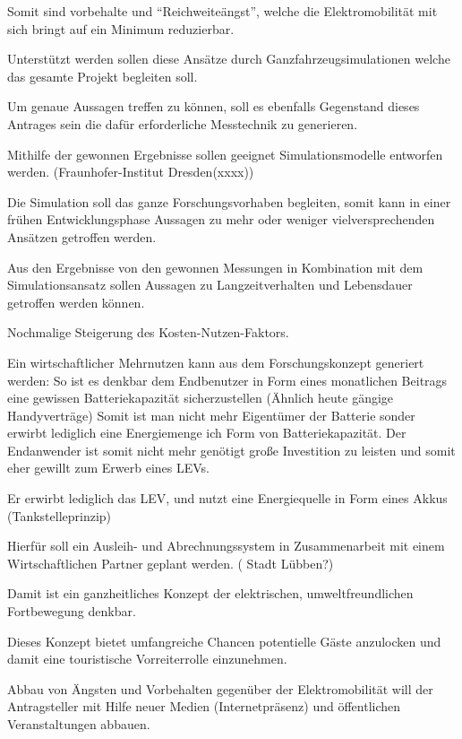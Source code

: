 Somit sind vorbehalte und "`Reichweiteängst"', welche die Elektromobilität mit sich bringt auf ein Minimum reduzierbar.

Unterstützt werden sollen diese Ansätze durch Ganzfahrzeugsimulationen welche das gesamte Projekt begleiten soll.
 
Um genaue Aussagen treffen zu können, soll es ebenfalls Gegenstand dieses Antrages sein die dafür erforderliche Messtechnik zu generieren.

Mithilfe der gewonnen Ergebnisse sollen geeignet Simulationsmodelle entworfen werden. (Fraunhofer-Institut Dresden(xxxx))

Die Simulation soll das ganze Forschungsvorhaben begleiten, somit kann in einer frühen Entwicklungsphase Aussagen zu mehr oder weniger vielversprechenden Ansätzen getroffen werden. 
 
Aus den Ergebnisse von den gewonnen Messungen in Kombination mit dem Simulationsansatz sollen Aussagen zu Langzeitverhalten und Lebensdauer getroffen werden können.

Nochmalige Steigerung des Kosten-Nutzen-Faktors.


Ein wirtschaftlicher Mehrnutzen kann aus dem Forschungskonzept generiert werden:
So ist es denkbar  dem Endbenutzer in Form eines monatlichen Beitrags eine gewissen Batteriekapazität sicherzustellen (Ähnlich heute gängige Handyverträge) Somit ist man nicht mehr Eigentümer der Batterie sonder erwirbt lediglich eine Energiemenge ich Form von Batteriekapazität. Der Endanwender ist somit nicht mehr genötigt große Investition zu leisten und somit eher gewillt zum Erwerb eines LEVs. 

Er erwirbt lediglich das LEV, und nutzt eine Energiequelle in Form eines Akkus (Tankstelleprinzip)

Hierfür soll ein Ausleih- und Abrechnungssystem in Zusammenarbeit mit einem Wirtschaftlichen Partner geplant werden. ( Stadt Lübben?)

Damit ist ein  ganzheitliches Konzept der elektrischen, umweltfreundlichen Fortbewegung denkbar.

Dieses Konzept bietet umfangreiche Chancen potentielle Gäste anzulocken und damit eine touristische Vorreiterrolle einzunehmen. 

Abbau von Ängsten und Vorbehalten gegenüber der Elektromobilität will der Antragsteller mit Hilfe neuer Medien (Internetpräsenz) und öffentlichen Veranstaltungen abbauen. 

